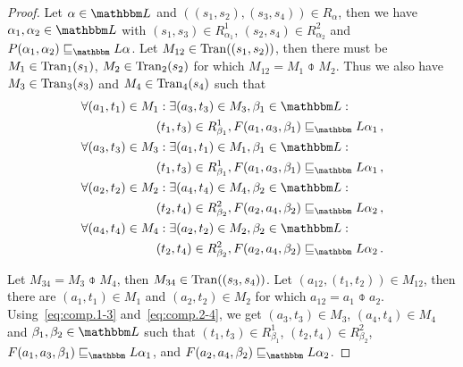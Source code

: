 \documentclass[twocolumn]{svjour3-dummy}
\newcommand*\Tran{\textup{\textrm{Tran}}}
\newcommand*\LL{\mathbbm L}
\begin{document}
\begin{proof}
  Let $\alpha\in \LL$ and $(( s_1, s_2),( s_3, s_4))\in R_\alpha$, then
  we have $\alpha_1, \alpha_2\in \LL$ with $( s_1, s_3)\in R^1_{
    \alpha_1}$, $( s_2, s_4)\in R^2_{ \alpha_2}$ and $P( \alpha_1,
  \alpha_2)\sqsubseteq_\LL \alpha$.  Let $M_{ 12}\in \Tran(( s_1,
  s_2))$, then there must be $M_1\in \Tran_1( s_1)$, $M_2\in \Tran_2(
  s_2)$ for which $M_{ 12}= M_1\obar M_2$.  Thus we also have $M_3\in
  \Tran_3( s_3)$ and $M_4\in \Tran_4( s_4)$ such that
  \begin{align}
    \notag & \forall( a_1, t_1)\in M_1: \exists( a_3, t_3)\in M_3,
    \beta_1\in \LL: \\
    \label{eq:comp.1-3}
    &\hspace*{6em} ( t_1, t_3)\in R^1_{ \beta_1}, F( a_1, a_3,
    \beta_1)\sqsubseteq_\LL \alpha_1\,, \\
    \notag & \forall( a_3, t_3)\in M_3: \exists( a_1, t_1)\in M_1,
    \beta_1\in \LL: \\
    \label{eq:comp.3-1}
    &\hspace*{6em} ( t_1, t_3)\in R^1_{ \beta_1}, F( a_1, a_3,
    \beta_1)\sqsubseteq_\LL \alpha_1\,, \\
    \notag & \forall( a_2, t_2)\in M_2: \exists( a_4, t_4)\in M_4,
    \beta_2\in \LL: \\
    \label{eq:comp.2-4}
    &\hspace*{6em} ( t_2, t_4)\in R^2_{ \beta_2}, F( a_2, a_4,
    \beta_2)\sqsubseteq_\LL \alpha_2\,, \\
    \notag & \forall( a_4, t_4)\in M_4: \exists( a_2, t_2)\in M_2,
    \beta_2\in \LL: \\
    \label{eq:comp.4-2}
    &\hspace*{6em} ( t_2, t_4)\in R^2_{ \beta_2}, F( a_2, a_4,
    \beta_2)\sqsubseteq_\LL \alpha_2\,.
  \end{align}

  Let $M_{ 34}= M_3\obar M_4$, then $M_{ 34}\in \Tran(( s_3, s_4))$.
  Let $( a_{ 12},( t_1, t_2))\in M_{ 12}$, then there are $( a_1,
  t_1)\in M_1$ and $( a_2, t_2)\in M_2$ for which $a_{ 12}= a_1\obar
  a_2$.  Using~\eqref{eq:comp.1-3} and~\eqref{eq:comp.2-4}, we get $(
  a_3, t_3)\in M_3$, $( a_4, t_4)\in M_4$ and $\beta_1, \beta_2\in \LL$
  such that $( t_1, t_3)\in R^1_{ \beta_1}$, $( t_2, t_4)\in R^2_{
    \beta_2}$, $F( a_1, a_3, \beta_1)\sqsubseteq_\LL \alpha_1$, and $F(
  a_2, a_4, \beta_2)\sqsubseteq_\LL \alpha_2$.


\end{proof}
\end{document}
